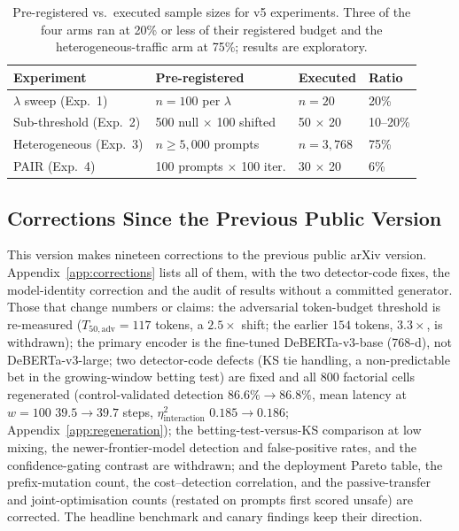 \documentclass{article}
\begin{document}
\begin{table}[h]
\centering
\small
\caption{Pre-registered vs.\ executed sample sizes for v5 experiments. Three of the four arms ran at 20\% or less of their registered budget and the heterogeneous-traffic arm at 75\%; results are exploratory.}
\label{tab:prereg-vs-actual}
\begin{tabular}{llll}
\toprule
\textbf{Experiment} & \textbf{Pre-registered} & \textbf{Executed} & \textbf{Ratio} \\
\midrule
$\lambda$ sweep (Exp.~1) & $n{=}100$ per $\lambda$ & $n{=}20$ & 20\% \\
Sub-threshold (Exp.~2) & 500 null $\times$ 100 shifted & 50 $\times$ 20 & 10--20\% \\
Heterogeneous (Exp.~3) & $n{\geq}5{,}000$ prompts & $n{=}3{,}768$ & 75\% \\
PAIR (Exp.~4) & 100 prompts $\times$ 100 iter. & 30 $\times$ 20 & 6\% \\
\bottomrule
\end{tabular}
\end{table}

\subsection{Corrections Since the Previous Public Version}
\label{sec:corrections}

This version makes nineteen corrections to the previous public arXiv version. Appendix~\ref{app:corrections} lists all of them, with the two detector-code fixes, the model-identity correction and the audit of results without a committed generator. Those that change numbers or claims: the adversarial token-budget threshold is re-measured ($T_{50,\text{adv}}=117$ tokens, a $2.5\times$ shift; the earlier $154$ tokens, $3.3\times$, is withdrawn); the primary encoder is the fine-tuned DeBERTa-v3-base (768-d), not DeBERTa-v3-large; two detector-code defects (KS tie handling, a non-predictable bet in the growing-window betting test) are fixed and all 800 factorial cells regenerated (control-validated detection $86.6\%\to86.8\%$, mean latency at $w{=}100$ $39.5\to39.7$ steps, $\eta^2_{\text{interaction}}$ $0.185\to0.186$; Appendix~\ref{app:regeneration}); the betting-test-versus-KS comparison at low mixing, the newer-frontier-model detection and false-positive rates, and the confidence-gating contrast are withdrawn; and the deployment Pareto table, the prefix-mutation count, the cost--detection correlation, and the passive-transfer and joint-optimisation counts (restated on prompts first scored unsafe) are corrected. The headline benchmark and canary findings keep their direction.
\end{document}
